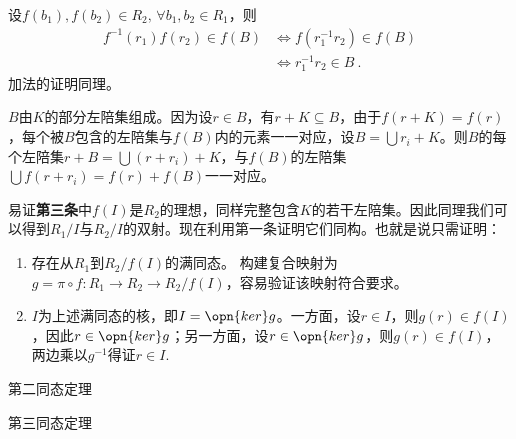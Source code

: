 设$f(b_1),f(b_2)\in R_2,\,\forall b_1,b_2\in R_1$，则
\begin{equation}
\begin{aligned}
f^{-1}(r_1)f(r_2)\in f(B)&\Leftrightarrow f(r_1^{-1}r_2)\in f(B)\\
&\Leftrightarrow r_1^{-1}r_2\in B~.
\end{aligned}
\end{equation}
加法的证明同理。

$B$由$K$的部分左陪集组成。因为设$r\in B$，有$r+K\subseteq B$，由于$f(r+K)=f(r)$，每个被$B$包含的左陪集与$f(B)$内的元素一一对应，设$B=\bigcup r_i+K$。则$B$的每个左陪集$r+B=\bigcup (r+r_i)+K$，与$f(B)$的左陪集$\bigcup f(r+r_i)=f(r)+f(B)$一一对应。

易证\textbf{第三条}中$f(I)$是$R_2$的理想，同样完整包含$K$的若干左陪集。因此同理我们可以得到$R_1/I$与$R_2/I$的双射。现在利用第一条证明它们同构。也就是说只需证明：
\begin{enumerate}
\item 存在从$R_1$到$R_2/f(I)$的满同态。
构建复合映射为$g=\pi\circ f:R_1\rightarrow R_2\rightarrow R_2/f(I)$，容易验证该映射符合要求。
\item $I$为上述满同态的核，即$I=\opn{ker}g$。一方面，设$r\in I$，则$g(r)\in f(I)$，因此$r\in \opn{ker}g$；另一方面，设$r\in \opn{ker}g$，则$g(r)\in f(I)$，两边乘以$g^{-1}$得证$r\in I$.
\end{enumerate}
\begin{theorem}{第二同态定理}

\end{theorem}

\begin{theorem}{第三同态定理}

\end{theorem}



